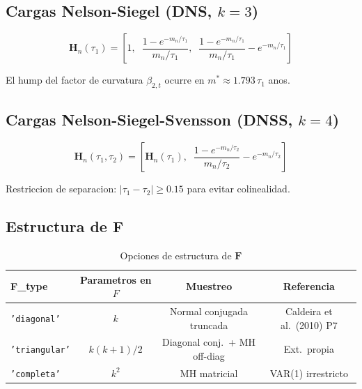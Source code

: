 \documentclass[12pt, a4paper]{article}
\theoremstyle{plain}
\theoremstyle{definition}
\theoremstyle{remark}
\newcommand{\bH}{\mathbf{H}}
\newcommand{\bF}{\mathbf{F}}
\begin{document}
\subsection{\texorpdfstring{Cargas Nelson-Siegel (DNS, $k=3$)}{Cargas Nelson-Siegel (DNS, k=3)}}

\begin{equation}
  \bH_n(\tau_1) = \left[
    1,\;\;
    \frac{1-e^{-m_n/\tau_1}}{m_n/\tau_1},\;\;
    \frac{1-e^{-m_n/\tau_1}}{m_n/\tau_1} - e^{-m_n/\tau_1}
  \right]
  \label{eq:ns}
\end{equation}

El hump del factor de curvatura $\beta_{2,t}$ ocurre en
$m^* \approx 1.793\,\tau_1$ anos.

\subsection{\texorpdfstring{Cargas Nelson-Siegel-Svensson (DNSS, $k=4$)}{Cargas Nelson-Siegel-Svensson (DNSS, k=4)}}

\begin{equation}
  \bH_n(\tau_1,\tau_2) = \left[
    \bH_n(\tau_1),\;\;
    \frac{1-e^{-m_n/\tau_2}}{m_n/\tau_2} - e^{-m_n/\tau_2}
  \right]
  \label{eq:nss}
\end{equation}

Restriccion de separacion: $|\tau_1 - \tau_2| \geq 0.15$ para evitar colinealidad.

\subsection{\texorpdfstring{Estructura de $\bF$}{Estructura de F}}

\begin{table}[H]
\centering
\caption{Opciones de estructura de $\bF$}
\small
\begin{tabular}{lccc}
\toprule
\textbf{F\_type} & \textbf{Parametros en $F$} & \textbf{Muestreo} & \textbf{Referencia} \\
\midrule
\texttt{'diagonal'}   & $k$ & Normal conjugada truncada & Caldeira et al.\ (2010) P7 \\
\texttt{'triangular'} & $k(k+1)/2$ & Diagonal conj.\ + MH off-diag & Ext.\ propia \\
\texttt{'completa'}   & $k^2$ & MH matricial & VAR(1) irrestricto \\
\bottomrule
\end{tabular}
\end{table}
\end{document}
